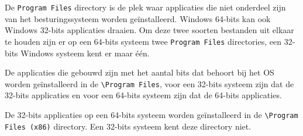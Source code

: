 De \texttt{Program Files} directory is de plek waar applicaties die niet onderdeel zijn van het besturingssysteem worden ge\"installeerd. Windows 64-bits kan ook Windows 32-bits applicaties draaien. Om deze twee soorten bestanden uit elkaar te houden zijn er op een 64-bits systeem twee \texttt{Program Files} directories, een 32-bits Windows systeem kent er maar \'e\'en.

De applicaties die gebouwd zijn met het aantal bits dat behoort bij het OS worden ge\"installeerd in de \texttt{\textbackslash Program Files}, voor een 32-bits systeem zijn dat de 32-bits applicaties en voor een 64-bits systeem zijn dat de 64-bits applicaties.

De 32-bits applicaties op een 64-bits systeem worden ge\"installeerd in de \texttt{\textbackslash Program Files (x86)} directory. Een 32-bits systeem kent deze directory niet.

